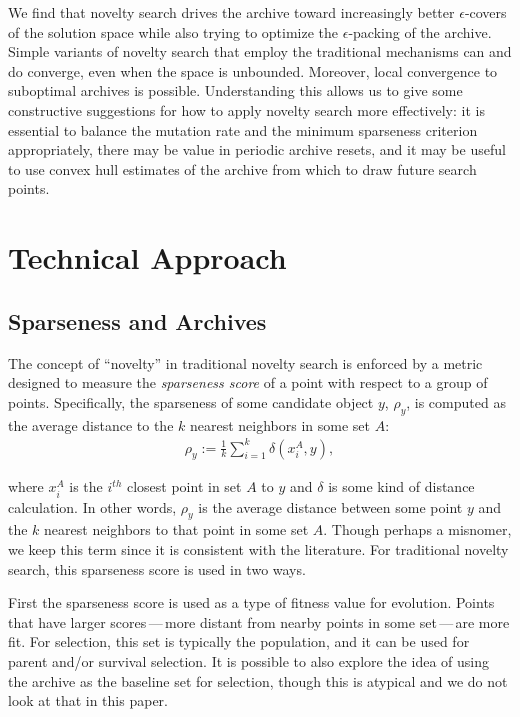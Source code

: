 \documentclass[twoside]{article}
\begin{document}
We find that novelty search drives the archive toward increasingly better $\epsilon$-covers of the solution space while also trying to optimize the $\epsilon$-packing of the archive.  Simple variants of novelty search that employ the traditional mechanisms can and do converge, even when the space is unbounded.  Moreover, local convergence to suboptimal archives is possible.  Understanding this allows us to give some constructive suggestions for how to apply novelty search more effectively: it is essential to balance the mutation rate and the minimum sparseness criterion appropriately, there may be value in periodic archive resets, and it may be useful to use convex hull estimates of the archive from which to draw future search points.



\section{Technical Approach}
\label{sec:approach}

\subsection{Sparseness and Archives}
\label{subsec:sparseness}

The concept of ``novelty'' in traditional novelty search is enforced by a metric designed to measure the \emph{sparseness score} of a point with respect to a group of points.  Specifically, the sparseness of some candidate object $y$, $\rho_y$, is computed as the average distance to the $k$ nearest neighbors in some set $A$:
%
\begin{eqnarray}
  \rho_y := \frac{1}{k} \sum_{i=1}^{k} \delta\left( x^A_i, y\right),
  \label{eqn:sparseness}
\end{eqnarray}

\noindent where $x^A_i$ is the $i^{th}$ closest point in set $A$ to $y$ and $\delta$ is some kind of distance calculation.  In other words, $\rho_y$ is the average distance between some point $y$ and the $k$ nearest neighbors to that point in some set $A$.  Though perhaps a misnomer, we keep this term since it is consistent with the literature.  For traditional novelty search, this sparseness score is used in two ways.  

First the sparseness score is used as a type of fitness value for evolution.  Points that have larger scores\,---\,more distant from nearby points in some set\,---\,are more fit.  For selection, this set is typically the population, and it can be used for parent and/or survival selection.  It is possible to also explore the idea of using the archive as the baseline set for selection, though this is atypical and we do not look at that in this paper.
\end{document}
